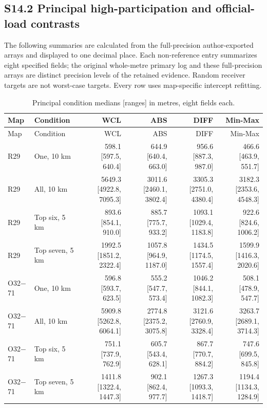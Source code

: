 \documentclass[journal,onecolumn,10pt]{IEEEtran}
\begin{document}
\subsection*{S14.2 Principal high-participation and official-load contrasts}
The following summaries are calculated from the full-precision author-exported arrays and displayed to one decimal place. Each non-reference entry summarizes eight specified fields; the original whole-metre primary log and these full-precision arrays are distinct precision levels of the retained evidence. Random receiver targets are not worst-case targets. Every row uses map-specific intercept refitting.
\begingroup\small
\begin{longtable}{@{}llrrrr@{}}
\caption{Principal condition medians [ranges] in metres, eight fields each.}\label{tab:s-main-ranges}\\
\toprule
Map & Condition & WCL & ABS & DIFF & Min-Max \\
\midrule\endfirsthead
\toprule
Map & Condition & WCL & ABS & DIFF & Min-Max \\
\midrule\endhead
\bottomrule\endfoot
R29 & One, 10 km & 598.1 [597.5, 640.4] & 644.9 [640.4, 663.0] & 956.6 [887.3, 987.0] & 466.6 [463.9, 551.7] \\
R29 & All, 10 km & 5649.3 [4922.8, 7095.3] & 3011.6 [2460.1, 3802.4] & 3305.3 [2751.0, 4380.4] & 3182.3 [2353.6, 4548.3] \\
R29 & Top six, 5 km & 893.6 [854.1, 910.0] & 885.7 [775.7, 933.2] & 1093.1 [1029.4, 1183.8] & 922.6 [824.6, 1006.2] \\
R29 & Top seven, 5 km & 1992.5 [1851.2, 2322.4] & 1057.8 [964.9, 1187.0] & 1434.5 [1174.5, 1557.4] & 1599.9 [1416.3, 2020.6] \\
O32$-$71 & One, 10 km & 596.8 [593.7, 623.5] & 555.2 [547.7, 573.4] & 1046.2 [844.1, 1082.3] & 508.1 [478.9, 547.7] \\
O32$-$71 & All, 10 km & 5909.8 [5262.8, 6064.1] & 2774.8 [2375.2, 3075.8] & 3121.6 [2760.9, 3328.4] & 3263.7 [2689.1, 3714.3] \\
O32$-$71 & Top six, 5 km & 751.1 [737.9, 762.9] & 605.7 [543.4, 628.1] & 867.7 [770.7, 884.2] & 747.6 [699.5, 845.8] \\
O32$-$71 & Top seven, 5 km & 1411.8 [1322.4, 1447.3] & 902.1 [862.4, 977.7] & 1267.3 [1093.3, 1418.7] & 1194.4 [1134.3, 1284.9] \\
\end{longtable}
\endgroup
\end{document}

